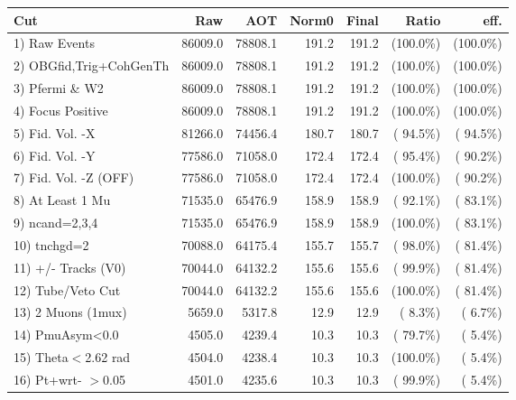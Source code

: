  \begin{table}[h!]\centering
 \begin{tabular}{||l||r|r|r|r|r|r||}
 \hline
 \hline
 Cut & Raw & AOT & Norm0 & Final & Ratio & eff.       \\
 \hline
  1) Raw Events           &      86009.0 &      78808.1 &        191.2 &        191.2 & (100.0\%) & (100.0\%) \\
  2) OBGfid,Trig+CohGenTh &      86009.0 &      78808.1 &        191.2 &        191.2 & (100.0\%) & (100.0\%) \\
  3) Pfermi \& W2         &      86009.0 &      78808.1 &        191.2 &        191.2 & (100.0\%) & (100.0\%) \\
  4) Focus Positive       &      86009.0 &      78808.1 &        191.2 &        191.2 & (100.0\%) & (100.0\%) \\
  5) Fid. Vol. -X         &      81266.0 &      74456.4 &        180.7 &        180.7 & ( 94.5\%) & ( 94.5\%) \\
  6) Fid. Vol. -Y         &      77586.0 &      71058.0 &        172.4 &        172.4 & ( 95.4\%) & ( 90.2\%) \\
  7) Fid. Vol. -Z (OFF)   &      77586.0 &      71058.0 &        172.4 &        172.4 & (100.0\%) & ( 90.2\%) \\
  8) At Least 1 Mu        &      71535.0 &      65476.9 &        158.9 &        158.9 & ( 92.1\%) & ( 83.1\%) \\
  9) ncand=2,3,4          &      71535.0 &      65476.9 &        158.9 &        158.9 & (100.0\%) & ( 83.1\%) \\
 10) tnchgd=2             &      70088.0 &      64175.4 &        155.7 &        155.7 & ( 98.0\%) & ( 81.4\%) \\
 11) +/- Tracks (V0)      &      70044.0 &      64132.2 &        155.6 &        155.6 & ( 99.9\%) & ( 81.4\%) \\
 12) Tube/Veto Cut        &      70044.0 &      64132.2 &        155.6 &        155.6 & (100.0\%) & ( 81.4\%) \\
 13) 2 Muons (1mux)       &       5659.0 &       5317.8 &         12.9 &         12.9 & (  8.3\%) & (  6.7\%) \\
 14) PmuAsym<0.0          &       4505.0 &       4239.4 &         10.3 &         10.3 & ( 79.7\%) & (  5.4\%) \\
 15) Theta$<$2.62 rad     &       4504.0 &       4238.4 &         10.3 &         10.3 & (100.0\%) & (  5.4\%) \\
 16) Pt+wrt- $>$0.05      &       4501.0 &       4235.6 &         10.3 &         10.3 & ( 99.9\%) & (  5.4\%) \\

\end{tabular}
\end{table}
